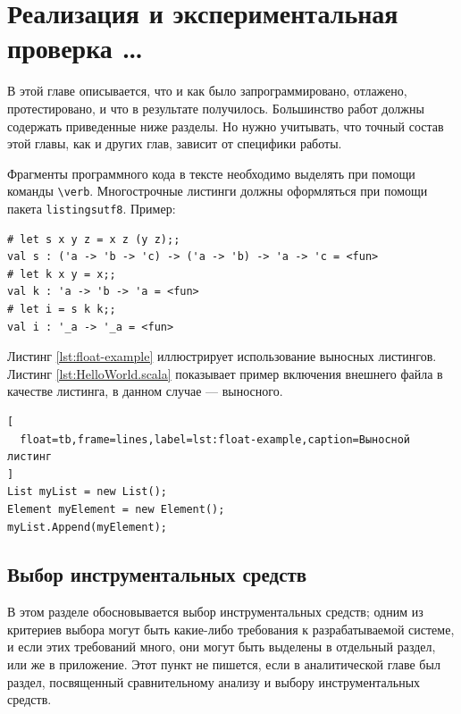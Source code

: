 \chapter{Реализация и экспериментальная проверка \dots}

В этой главе описывается, что и как было запрограммировано, отлажено, 
протестировано, и что в результате получилось. Большинство работ должны 
содержать приведенные ниже разделы. Но нужно учитывать, что точный состав 
этой главы, как и других глав, зависит от специфики работы.

Фрагменты программного кода в тексте необходимо выделять при помощи команды 
\verb|\verb|. Многострочные листинги должны оформляться при помощи пакета 
\verb|listingsutf8|. Пример:

\begin{lstlisting}
# let s x y z = x z (y z);;
val s : ('a -> 'b -> 'c) -> ('a -> 'b) -> 'a -> 'c = <fun>
# let k x y = x;;
val k : 'a -> 'b -> 'a = <fun>
# let i = s k k;;
val i : '_a -> '_a = <fun>
\end{lstlisting}

Листинг \ref{lst:float-example} иллюстрирует использование выносных листингов.
Листинг \ref{lst:HelloWorld.scala} показывает пример включения внешнего файла 
в качестве листинга, в данном случае --- выносного.

\begin{lstlisting}[
  float=tb,frame=lines,label=lst:float-example,caption=Выносной листинг
]
List myList = new List();
Element myElement = new Element();
myList.Append(myElement);
\end{lstlisting}



\section{Выбор инструментальных средств}

В этом разделе обосновывается выбор инструментальных средств; одним из критериев выбора могут быть какие-либо требования к разрабатываемой системе, и если этих требований много, они могут быть выделены в отдельный раздел, или же в приложение. Этот пункт не пишется, если в аналитической главе был раздел, посвященный сравнительному анализу и выбору инструментальных средств.




